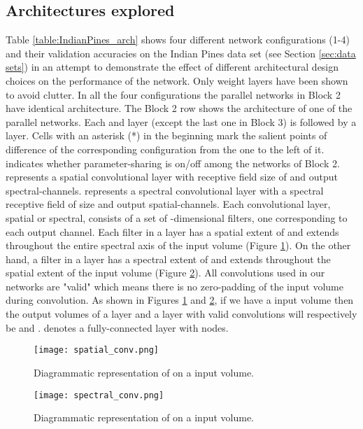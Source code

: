 \documentclass[journal]{IEEEtran}
\begin{document}
\subsection{Architectures explored}
Table \ref{table:IndianPines_arch} shows four different network configurations (1-4) and their validation accuracies on the Indian Pines data set (see Section \ref{sec:data sets}) in an attempt to demonstrate the effect of different architectural design choices on the performance of the network. Only weight layers have been shown to avoid clutter. In all the four configurations the parallel networks in Block 2 have identical architecture. The Block 2 row shows the architecture of one of the parallel networks. Each  and  layer (except the last one in Block 3) is followed by a  layer. Cells with an asterisk (*) in the beginning mark the salient points of difference of the corresponding configuration from the one to the left of it.  indicates whether parameter-sharing is on/off among the networks of Block 2.  represents a spatial convolutional layer with receptive field size of  and  output spectral-channels.  represents a spectral convolutional layer with a spectral receptive field of size  and  output spatial-channels. Each convolutional layer, spatial or spectral, consists of a set of -dimensional filters, one corresponding to each output channel. Each filter in a  layer has a spatial extent of  and extends throughout the entire spectral axis of the input volume (Figure \ref{fig:spatial_conv}). On the other hand, a filter in a  layer has a spectral extent of  and extends throughout the spatial extent of the input volume (Figure \ref{fig:spectral_conv}). All convolutions used in our networks are "valid" which means there is no zero-padding of the input volume during convolution. As shown in Figures \ref{fig:spatial_conv} and \ref{fig:spectral_conv}, if we have a  input volume then the output volumes of a  layer and a  layer with valid convolutions will respectively be  and .  denotes a fully-connected layer with  nodes.\\

\begin{figure}
\centering
	\texttt{[image: spatial\_conv.png]}
	\caption{Diagrammatic representation of  on a  input volume.}
	\label{fig:spatial_conv}
\end{figure}

\begin{figure}
\centering
	\texttt{[image: spectral\_conv.png]}
	\caption{Diagrammatic representation of  on a  input volume.}
	\label{fig:spectral_conv}
\end{figure}
\end{document}
